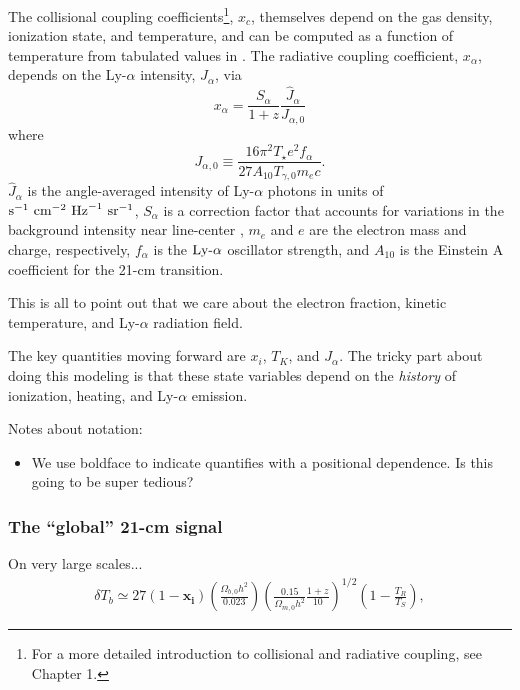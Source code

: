 The collisional coupling coefficients\footnote{For a more detailed introduction to collisional and radiative coupling, see Chapter 1.}, $x_c$, themselves depend on the gas density, ionization state, and temperature, and can be computed as a function of temperature from tabulated values in \cite{Zygelman2005}. The radiative coupling coefficient, $x_{\alpha}$, depends on the Ly-$\alpha$ intensity, $J_{\alpha}$, via
\begin{equation}
    x_{\alpha} = \frac{S_{\alpha}}{1+z} \frac{\hat{J}_{\alpha}}{{J}_{\alpha,0}} \label{eq:Jalpha}
\end{equation}
where
\begin{equation}
    J_{\alpha,0} \equiv \frac{16\pi^2 T_{\star} e^2 f_{\alpha}}{27 A_{10} T_{\gamma,0} m_e c} .
\end{equation}
$\hat{J}_{\alpha}$ is the angle-averaged intensity of Ly-$\alpha$ photons in
units of $\text{s}^{-1} \ \text{cm}^{-2} \ \mathrm{Hz}^{-1} \ \text{sr}^{-1}$, $S_{\alpha}$ is a correction factor that
accounts for variations in the background intensity near line-center
\cite{Chen2004,FurlanettoPritchard2006,Hirata2006}, $m_e$ and $e$ are the
electron mass and charge, respectively, $f_{\alpha}$ is the $\text{Ly-}\alpha$ oscillator
strength, and $A_{10}$ is the Einstein A coefficient for the 21-cm transition.

This is all to point out that we care about the electron fraction, kinetic temperature, and Ly-$\alpha$ radiation field.

The key quantities moving forward are $x_i$, $T_K$, and $J_{\alpha}$. The tricky part about doing this modeling is that these state variables depend on the \textit{history} of ionization, heating, and Ly-$\alpha$ emission.

Notes about notation:
\begin{itemize}
	\item We use boldface to indicate quantifies with a positional dependence. Is this going to be super tedious?
\end{itemize}


\subsubsection{The ``global'' 21-cm signal}
On very large scales...
\begin{align}
    \delta T_b \simeq 27 (1 - \mathbf{x_i}) \left(\frac{\Omega_{b,0} h^2}{0.023} \right) \left(\frac{0.15}{\Omega_{m,0} h^2} \frac{1 + z}{10} \right)^{1/2} \left(1 - \frac{T_R}{T_S} \right) , \label{eq:dTb}
\end{align}

